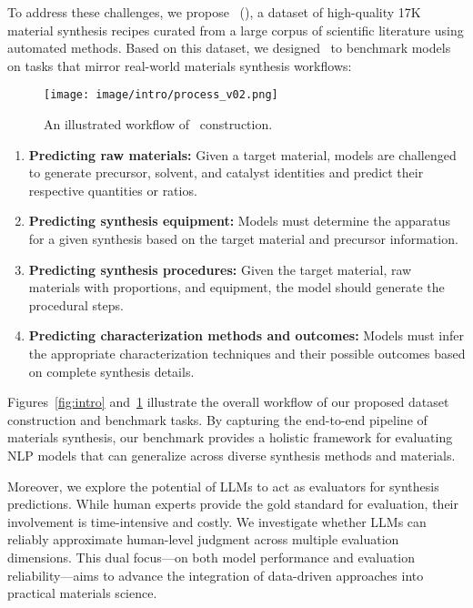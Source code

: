 To address these challenges, we propose \oursdatalong~(\oursdatashort), a dataset of high-quality 17K material synthesis recipes curated from a large corpus of scientific literature using automated methods. 
Based on this dataset, we designed \oursbench~to benchmark models on tasks that mirror real-world materials synthesis workflows:

\begin{figure}[!t]
    \centering
    \texttt{[image: image/intro/process\_v02.png]}
    \caption{An illustrated workflow of \oursdatalong~construction.}
    \label{fig:intro_data_collection}
\end{figure}

\begin{enumerate}
    \item \textbf{Predicting raw materials:} Given a target material, models are challenged to generate precursor, solvent, and catalyst identities and predict their respective quantities or ratios.
    \item \textbf{Predicting synthesis equipment:} Models must determine the apparatus for a given synthesis based on the target material and precursor information.
    \item \textbf{Predicting synthesis procedures:} Given the target material, raw materials with proportions, and equipment, the model should generate the procedural steps.
    \item \textbf{Predicting characterization methods and outcomes:} Models must infer the appropriate characterization techniques and their possible outcomes based on complete synthesis details.
\end{enumerate}




Figures~\ref{fig:intro} and~\ref{fig:intro_data_collection} illustrate the overall workflow of our proposed dataset construction and benchmark tasks. By capturing the end-to-end pipeline of materials synthesis, our benchmark provides a holistic framework for evaluating NLP models that can generalize across diverse synthesis methods and materials.

Moreover, we explore the potential of LLMs to act as evaluators for synthesis predictions. While human experts provide the gold standard for evaluation, their involvement is time-intensive and costly. We investigate whether LLMs can reliably approximate human-level judgment across multiple evaluation dimensions. This dual focus—on both model performance and evaluation reliability—aims to advance the integration of data-driven approaches into practical materials science.

